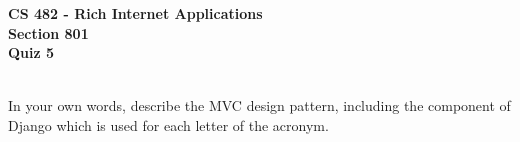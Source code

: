 \documentclass[letterpaper]{exam}
\begin{document}
\begin{center}
	\textbf{CS 482 - Rich Internet Applications} \\
	\textbf{Section 801} \\
	\textbf{Quiz 5} \\
	\vspace{5mm}
	 \\
\end{center}


\begin{questions}
	\question[10] In your own words, describe the MVC design pattern, including the component of Django which is used for each letter of the acronym.
	
\end{questions}
\end{document}

